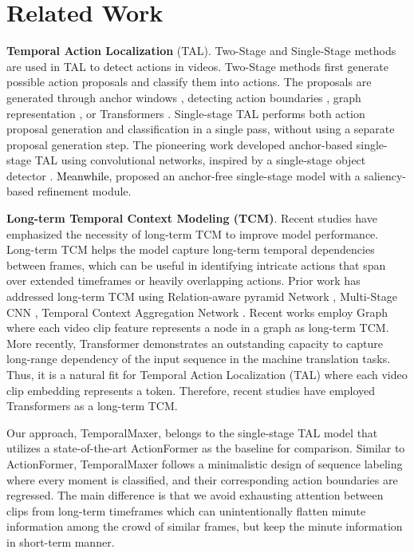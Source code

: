 \documentclass[10pt,twocolumn,letterpaper]{article}
\newcommand{\ky}[1]{\textcolor{black}{{#1}}}
\begin{document}
 \section{Related Work}
\textbf{Temporal Action Localization} (TAL). Two-Stage and Single-Stage methods are used in TAL to detect actions in videos. Two-Stage methods first generate possible action proposals and classify them into actions. The proposals are generated through anchor windows \cite{escorcia2016daps, buch2017sst, heilbron2016fast}, detecting action boundaries \cite{lin2018bsn, gong2020scale, zhao2020bottom}, graph representation \cite{bai2020boundary, xu2020g}, or Transformers \cite{wang2021temporal, chang2021augmented, tan2021relaxed}.
Single-stage TAL performs both action proposal generation and classification in a single pass, without using a separate proposal generation step. The pioneering work \cite{qing2021temporal} developed anchor-based single-stage TAL using convolutional networks, inspired by a single-stage object detector \cite{redmon2016you, liu2016ssd}. \ky{Meanwhile,} \cite{lin2021learning} proposed an anchor-free single-stage model with a saliency-based refinement module.


\textbf{Long-term Temporal Context Modeling (TCM)}. Recent studies have emphasized the necessity of long-term TCM to improve model performance. Long-term TCM helps the model capture long-term temporal dependencies between frames, which can be useful in identifying intricate actions that span over extended timeframes or heavily overlapping actions. Prior work has addressed long-term TCM using Relation-aware pyramid Network \cite{gao2020accurate}, Multi-Stage CNN \cite{farha2019ms}, Temporal Context Aggregation Network \cite{qing2021temporal}. Recent works \cite{xu2020g, zhao2021video} employ Graph \cite{kipf2016semi} where each video clip feature represents a node in a graph as long-term TCM. More recently, Transformer \cite{vaswani2017attention} demonstrates an outstanding capacity to capture long-range dependency of the input sequence in the machine translation tasks. Thus, it is a natural fit for Temporal Action Localization (TAL) where each video clip embedding represents a token. Therefore, recent studies \cite{zhang2022actionformer, liu2022end, zhao2021actionness, kang2022htnet} have employed Transformers as a long-term TCM.

Our approach, TemporalMaxer, belongs to the single-stage TAL model that utilizes a state-of-the-art ActionFormer \cite{zhang2022actionformer} as the baseline for comparison. Similar to ActionFormer, TemporalMaxer follows a minimalistic design of sequence labeling where every moment is classified, and their corresponding action boundaries are regressed. 
The main difference is that we avoid exhausting attention between clips from long-term timeframes which can unintentionally flatten minute information among the crowd of similar frames, but keep the minute information in short-term manner.
\end{document}
